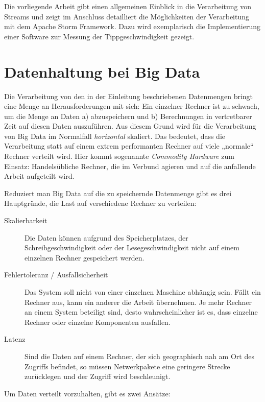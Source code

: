 \documentclass[a4paper,11pt]{scrartcl}
\begin{document}
  Die vorliegende Arbeit gibt einen allgemeinen Einblick in die Verarbeitung
  von Streams und zeigt im Anschluss detailliert die Möglichkeiten der
  Verarbeitung mit dem Apache Storm Framework. Dazu wird exemplarisch die
  Implementierung einer Software zur Messung der Tippgeschwindigkeit gezeigt.


  \section{Datenhaltung bei Big Data}
  Die Verarbeitung von den in der Einleitung beschriebenen Datenmengen bringt
  eine Menge an Herausforderungen mit sich: Ein einzelner Rechner ist zu
  schwach, um die Menge an Daten a) abzuspeichern und b) Berechnungen in
  vertretbarer Zeit auf diesen Daten auszuführen. Aus diesem Grund wird für die
  Verarbeitung von Big Data im Normalfall \textit{horizontal} skaliert. Das
  bedeutet, dass die Verarbeitung statt auf einem extrem performanten Rechner
  auf viele „normale“ Rechner verteilt wird.  Hier kommt sogenannte
  \textit{Commodity Hardware} zum Einsatz: Handelsübliche Rechner, die im
  Verbund agieren und auf die anfallende Arbeit aufgeteilt
  wird.\cite[S.~42]{white2010}

  Reduziert man Big Data auf die zu speichernde Datenmenge gibt es drei
  Hauptgründe, die Last auf verschiedene Rechner zu
  verteilen:\cite[S.~145]{kleppmann17}

  \begin{description}
    \item[Skalierbarkeit] Die Daten können aufgrund des Speicherplatzes, der
      Schreibgeschwindigkeit oder der Lesegeschwindigkeit nicht auf einem
      einzelnen Rechner gespeichert werden.
    \item[Fehlertoleranz / Ausfallsicherheit] Das System soll nicht von einer
      einzelnen Maschine abhängig sein. Fällt ein Rechner aus, kann ein anderer
      die Arbeit übernehmen. Je mehr Rechner an einem System beteiligt sind,
      desto wahrscheinlicher ist es, dass einzelne Rechner oder einzelne
      Komponenten ausfallen.
    \item[Latenz] Sind die Daten auf einem Rechner, der sich geographisch nah am
      Ort des Zugriffs befindet, so müssen Netwerkpakete eine geringere Strecke
      zurücklegen und der Zugriff wird beschleunigt.
  \end{description}

  Um Daten verteilt vorzuhalten, gibt es zwei
  Ansätze:\cite[S.~147]{kleppmann17}
\end{document}
